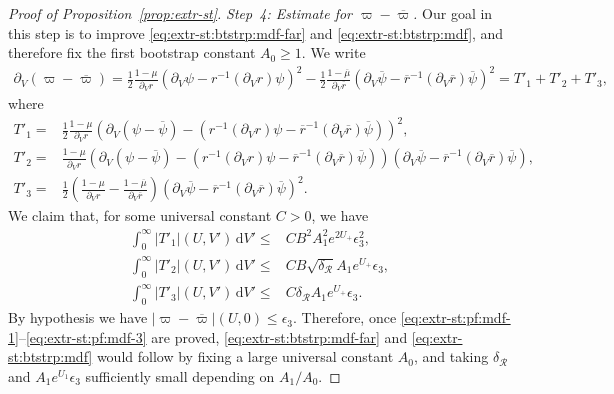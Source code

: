 \documentclass[10pt, reqno]{amsart}
\theoremstyle{definition}
\theoremstyle{remark}
\theoremstyle{conjecture}
\numberwithin{equation}{section}
\newcommand{\abs}[1]{\vert#1\vert}
\newcommand{\ud}{\mathrm{d}}
\newcommand{\rd}{\partial}
\newcommand{\0}{\emptyset}
\newcommand{\dlt}{\delta}
\newcommand{\eps}{\epsilon}
\newcommand{\calR}{\mathcal R}
\newcommand{\pfstep}[1]{\vspace{.5em} {\it \noindent #1.}}
\newcommand{\psibg}{\overline{\psi}}				%
\newcommand{\rbg}{\overline{r}}					%
\newcommand{\varpibg}{\overline{\varpi}}				%
\newcommand{\mubg}{\overline{\mu}}				%
\begin{document}
\begin{proof}[Proof of Proposition~\ref{prop:extr-st}]
 \pfstep{Step~4: Estimate for $\varpi - \varpibg$}
Our goal in this step is to improve \eqref{eq:extr-st:btstrp:mdf-far} and \eqref{eq:extr-st:btstrp:mdf}, and therefore fix the first bootstrap constant $A_{0} \geq 1$. We write
\begin{align*}
	\rd_{V} (\varpi - \varpibg) 
	= \frac{1}{2} \frac{1-\mu}{\rd_{V} r} (\rd_{V} \psi - r^{-1} (\rd_{V} r ) \psi)^{2} - \frac{1}{2} \frac{1-\mubg}{\rd_{V} \rbg} (\rd_{V} \psibg - \rbg^{-1} (\rd_{V} \rbg ) \psibg)^{2} 
	= T'_{1} + T'_{2} + T'_{3},
\end{align*}
where
\begin{align*}
	T'_{1} =& \frac{1}{2} \frac{1-\mu}{\rd_{V} r} (\rd_{V} (\psi - \psibg) - (r^{-1} (\rd_{V} r ) \psi - \rbg^{-1} (\rd_{V} \rbg ) \psibg))^{2} , \\
	T'_{2} = & \frac{1-\mu}{\rd_{V} r} (\rd_{V} (\psi - \psibg) - (r^{-1} (\rd_{V} r ) \psi - \rbg^{-1} (\rd_{V} \rbg )  \psibg)) (\rd_{V} \psibg - \rbg^{-1} ( \rd_{V} \rbg ) \psibg) , \\
	T'_{3} = & \frac{1}{2} \left( \frac{1-\mu}{\rd_{V} r} - \frac{1-\mubg}{\rd_{V} \rbg}\right) (\rd_{V} \psibg - \rbg^{-1} (\rd_{V} \rbg ) \psibg)^{2}.
\end{align*}
We claim that, for some universal constant $C > 0$, we have
\begin{align} 
	\int_{0}^{\infty} \abs{T'_{1}}(U, V') \, \ud V' \leq & C B^{2} A_{1}^{2} e^{2 U_{+}} \eps_{3}^{2}, \label{eq:extr-st:pf:mdf-1} \\
	\int_{0}^{\infty} \abs{T'_{2}}(U, V') \, \ud V' \leq & C B \sqrt{ \dlt_{\calR}} A_{1} e^{U_{+}} \eps_{3}, \label{eq:extr-st:pf:mdf-2} \\
	\int_{0}^{\infty} \abs{T'_{3}}(U, V') \, \ud V' \leq & C \dlt_{\calR} A_{1} e^{U_{+}} \eps_{3}. \label{eq:extr-st:pf:mdf-3}
\end{align}
By hypothesis we have $\abs{\varpi - \varpibg}(U, 0) \leq \eps_{3}$. Therefore, once \eqref{eq:extr-st:pf:mdf-1}--\eqref{eq:extr-st:pf:mdf-3} are proved, \eqref{eq:extr-st:btstrp:mdf-far} and \eqref{eq:extr-st:btstrp:mdf} would follow by fixing a large universal constant $A_{0}$, and taking $\dlt_{\calR}$ and $A_{1} e^{U_{1}}  \eps_{3}$ sufficiently small depending on $A_{1} / A_{0}$.


\end{proof}
\end{document}
